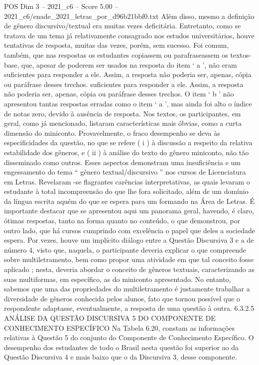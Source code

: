 \begin{textsample}{POS Dim 3 – 2021\_c6 – Score 5.00 – 2021\_c6/enade\_2021\_letras\_por\_d96b21bbf0.txt}
Além disso, mesmo a definição de gênero discursivo/textual era muitas vezes deficitária.
Entretanto, como se tratava de um tema já relativamente consagrado nos estudos universitários, houve tentativas de resposta, muitas das vezes, porém, sem sucesso.
Foi comum, também, que nas respostas os estudantes copiassem ou parafraseassem os textos-base, que, apesar de poderem ser usados na resposta do item ‘ a ’, não eram suficientes para responder a ele.
Assim, a resposta não poderia ser, apenas, cópia ou paráfrase desses trechos. suficientes para responder a ele.
Assim, a resposta não poderia ser, apenas, cópia ou paráfrase desses trechos.
O item ‘ b ’ não apresentou tantas respostas erradas como o item ‘ a ’, mas ainda foi alto o índice de notas zero, devido à ausência de resposta.
Nos textos, os participantes, em geral, como já mencionado, listaram características mais óbvias, como a curta dimensão do miniconto.
Provavelmente, o fraco desempenho se deva às especificidades da questão, no que se refere ( i ) à discussão a respeito da relativa estabilidade dos gêneros, e ( ii ) à análise do texto do gênero miniconto, não tão disseminado como outros.
Esses aspectos demonstram uma insuficiência e um engessamento do tema “ gênero textual/discursivo ” nos cursos de Licenciatura em Letras.
Revelaram -se flagrantes carências interpretativas, as quais levaram o estudante à total incompreensão do que lhe fora solicitado, além de um domínio da língua escrita aquém do que se espera para um formando na Área de Letras.
É importante destacar que se apresentou aqui um panorama geral, havendo, é claro, ótimas respostas, tanto na forma quanto no conteúdo, o que demonstrou, por outro lado, que há cursos cumprindo com excelência o papel que deles a sociedade espera.
Por vezes, houve um implícito diálogo entre a Questão Discursiva 3 e a de número 4, visto que, naquela, o participante deveria explicar o que compreende sobre multiletramento, bem como propor uma atividade em que tal conceito fosse aplicado ; nesta, deveria abordar o conceito de gêneros textuais, caracterizando as suas multiformas, em específico, as do miniconto apresentado.
No entanto, sabemos que uma das propriedades do multiletramento é justamente trabalhar a diversidade de gêneros conhecida pelos alunos, fato que tornou possível que o respondente adaptasse, eventualmente, a resposta de uma questão à outra. 6.3.2.5 ANÁLISE DA QUESTÃO DISCURSIVA 5 DO COMPONENTE DE CONHECIMENTO ESPECÍFICO Na Tabela 6.20, constam as informações relativas à Questão 5 do conjunto do Componente de Conhecimento Específico.
O desempenho dos estudantes de todo o Brasil nesta questão foi superior ao da Questão Discursiva 4 e mais baixo que o da Discursiva 3, desse componente.

\end{textsample}
